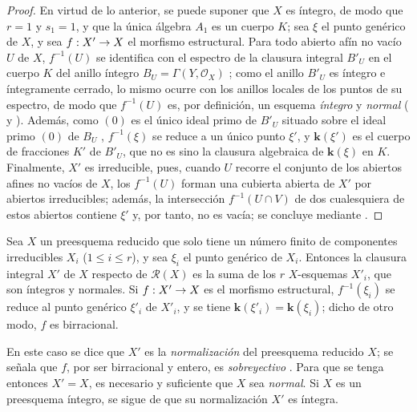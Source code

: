 \documentclass[oneside,10pt]{amsart}
\makeatletter
\renewcommand{\leq}{\leqslant}
\newcommand{\ega@arrow}[2]{\mathchoice{#1}{#2}{#2}{#2}}
\renewcommand{\to}{\ega@arrow{\longrightarrow}{\rightarrow}}
\let\EGAOriginalLabel\label
\renewcommand{\label}[1]{\phantomsection\EGAOriginalLabel{#1}}
\makeatother
\begin{document}
\begin{proof}
En virtud de lo anterior, se puede suponer que $X$ es íntegro, de modo que $r=1$ y $s_1=1$, y que la única álgebra $A_1$ es un cuerpo $K$;
sea $\xi$ el punto genérico de $X$, y sea $f:X'\to X$ el morfismo estructural.
Para todo abierto afín no vacío $U$ de $X$, $f^{-1}(U)$ se identifica con el espectro de la clausura integral $B'_U$ en el cuerpo $K$ del anillo íntegro $B_U=\Gamma(Y,\mathcal{O}_X)$ ;
como el anillo $B'_U$ es íntegro e íntegramente cerrado, lo mismo ocurre con los anillos locales de los puntos de su espectro, de modo que $f^{-1}(U)$ es, por definición, un esquema \emph{íntegro} y \emph{normal} ( y ).
Además, como $(0)$ es el único ideal primo de $B'_U$ situado sobre el ideal primo $(0)$ de $B_U$ \cite[t.~I, p.~259]{I-13}, $f^{-1}(\xi)$ se reduce a un único punto $\xi'$, y $\boldsymbol{k}(\xi')$ es el cuerpo de fracciones $K'$ de $B'_U$, que no es sino la clausura algebraica de $\boldsymbol{k}(\xi)$ en $K$.
Finalmente, $X'$ es irreducible, pues, cuando $U$ recorre el conjunto de los abiertos afines no vacíos de $X$, los $f^{-1}(U)$ forman una cubierta abierta de $X'$ por abiertos irreducibles;
además, la intersección $f^{-1}(U\cap V)$ de dos cualesquiera de estos abiertos contiene $\xi'$ y, por tanto, no es vacía; se concluye mediante .
\end{proof}

\begin{corollary}[6.3.8]
\label{II.6.3.8-fr}
Sea $X$ un preesquema reducido que solo tiene un número finito de componentes irreducibles $X_i$ ($1\leq i\leq r$), y sea $\xi_i$ el punto genérico de $X_i$.
Entonces la clausura integral $X'$ de $X$ respecto de $\mathcal{R}(X)$ es la suma de los $r$ $X$-esquemas $X'_i$, que son íntegros y normales.
Si $f:X'\to X$ es el morfismo estructural, $f^{-1}(\xi_i)$ se reduce al punto genérico $\xi'_i$ de $X'_i$, y se tiene $\boldsymbol{k}(\xi'_i)=\boldsymbol{k}(\xi_i)$; dicho de otro modo, $f$ es birracional.
\end{corollary}

En este caso se dice que $X'$ es la \emph{normalización} del preesquema reducido $X$;
se señala que $f$, por ser birracional y entero, es \emph{sobreyectivo} .
Para que se tenga entonces $X'=X$, es necesario y suficiente que $X$ sea \emph{normal}.
Si $X$ es un preesquema íntegro, se sigue de  que su normalización $X'$ es íntegra.
\end{document}
